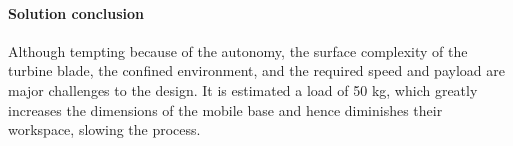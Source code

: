 




\paragraph{Solution conclusion}
Although tempting because of the autonomy, the surface complexity of the
turbine blade, the confined environment, and the required speed and payload are
major challenges to the design. It is estimated a load of 50 kg, which greatly
increases the dimensions of the mobile base and hence diminishes their
workspace, slowing the process.


